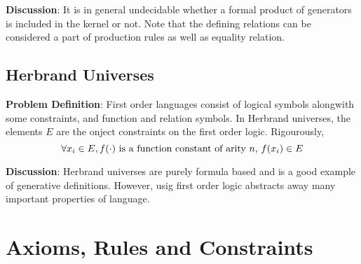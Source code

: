 \documentclass{report}
\begin{document}
\textbf{Discussion}: It is in general undecidable whether a formal product of
generators is included in the kernel or not. Note that the defining relations
can be considered a part of production rules as well as equality relation.

\subsection{Herbrand Universes}

\textbf{Problem Definition}: First order languages consist of logical symbols
alongwith some constraints, and function and relation symbols. In Herbrand
universes, the elements $E$ are the onject constraints on the first order
logic. Rigourously,
$$
\forall x_i \in E, \\
f(\cdot) \text{ is a function constant of arity } n,\, f(x_i) \in E
$$

\textbf{Discussion}: Herbrand universes are purely formula based and is a
good example of generative definitions. However, usig first order logic
abstracts away many important properties of language.

\section{Axioms, Rules and Constraints}
\end{document}
